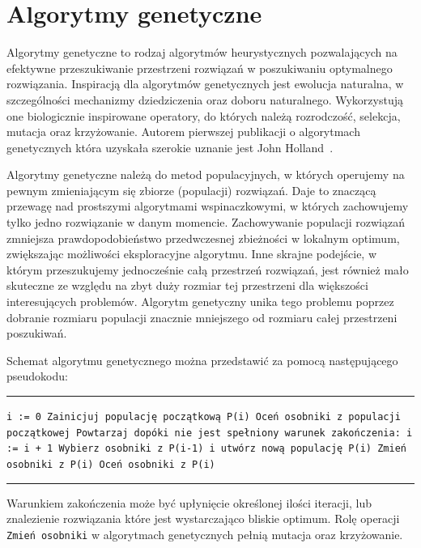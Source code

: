 \documentclass{xmgr}
\begin{document}
\chapter{Algorytmy genetyczne}

Algorytmy genetyczne to rodzaj algorytmów heurystycznych pozwalających na efektywne przeszukiwanie przestrzeni rozwiązań w poszukiwaniu optymalnego rozwiązania. Inspiracją dla algorytmów genetycznych jest ewolucja naturalna, w szczególności mechanizmy dziedziczenia oraz doboru naturalnego. Wykorzystują one biologicznie inspirowane operatory, do których należą rozrodczość, selekcja, mutacja oraz krzyżowanie. Autorem pierwszej publikacji o algorytmach genetycznych która uzyskała szerokie uznanie jest John Holland~\cite{Holland1975}.

Algorytmy genetyczne należą do metod populacyjnych, w których operujemy na pewnym zmieniającym się zbiorze (populacji) rozwiązań. Daje to znaczącą przewagę nad prostszymi algorytmami wspinaczkowymi, w których zachowujemy tylko jedno rozwiązanie w danym momencie. Zachowywanie populacji rozwiązań zmniejsza prawdopodobieństwo przedwczesnej zbieżności w lokalnym optimum, zwiększając możliwości eksploracyjne algorytmu. Inne skrajne podejście, w którym przeszukujemy jednocześnie całą przestrzeń rozwiązań, jest również mało skuteczne ze względu na zbyt duży rozmiar tej przestrzeni dla większości interesujących problemów. Algorytm genetyczny unika tego problemu poprzez dobranie rozmiaru populacji znacznie mniejszego od rozmiaru całej przestrzeni poszukiwań.

Schemat algorytmu genetycznego można przedstawić za pomocą następującego pseudokodu:

\noindent
\rule{360pt}{0.5pt}\newline
\texttt{i := 0\newline
Zainicjuj populację początkową P(i)\newline
Oceń osobniki z populacji początkowej\newline
Powtarzaj dopóki nie jest spełniony warunek zakończenia:\newline
\indent i := i + 1\newline
\indent Wybierz osobniki z P(i-1) i utwórz nową populację P(i)\newline
\indent Zmień osobniki z P(i)\newline
\indent Oceń osobniki z P(i)\newline
}
\rule{360pt}{0.5pt}

Warunkiem zakończenia może być upłynięcie określonej ilości iteracji, lub znalezienie rozwiązania które jest wystarczająco bliskie optimum. Rolę operacji \texttt{Zmień osobniki} w algorytmach genetycznych pełnią mutacja oraz krzyżowanie.
\end{document}
